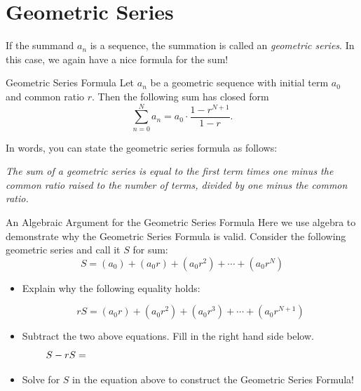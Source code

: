 \section{Geometric Series} If the summand $a_n$ is a  sequence, the summation is called an \emph{geometric series}.  In this case, we again have a nice formula for the sum!  

\begin{theorem}{ Geometric Series Formula}  Let $a_n$ be a geometric sequence with initial term $a_0$ and common ratio $r$.  Then the following sum has closed form $$\sum_{n=0}^N a_n = a_0\cdot\frac{1-r^{N+1}}{1-r}. $$
\end{theorem}

In words, you can state the geometric series formula as follows:
\begin{center}\emph{The sum of a geometric series is equal to the first term times one minus the common ratio raised to the number of terms, divided by one minus the common ratio.}\end{center}

\begin{exercise}{An Algebraic Argument for the Geometric Series Formula \Coffeecup \Coffeecup \Coffeecup}
Here we use algebra to demonstrate why the Geometric Series Formula is valid.  
Consider the following geometric series and call it $S$ for sum:  $$S=\left(a_0\right)+\left(a_0r\right)+\left(a_0r^2\right)+\cdots+\left(a_0r^N\right)$$
\begin{itemize}

\item Explain why the following equality holds:

$$ rS=\left(a_0r\right)+\left(a_0r^2\right)+\left(a_0r^3\right)+\cdots+\left(a_0r^{N+1}\right)$$


\item Subtract the two above equations.  Fill in the right hand side below.
$$S-rS=\hspace{3.5in} $$
\solushun{\begin{align*}
    S-rS=\left(a_0\right)&+\left(a_0r\right)+\left(a_0r^2\right)+\cdots+\left(a_0r^N\right)\\
    &-\left(a_0r\right)-\left(a_0r^2\right)-\left(a_0r^3\right)-\cdots-\left(a_0r^{N+1}\right)]\\
    =&a_0-a_0r^{N+1}
\end{align*}}{0in}
\item Solve for $S$ in the equation above to construct the Geometric Series Formula!
\end{itemize}
\end{exercise}

